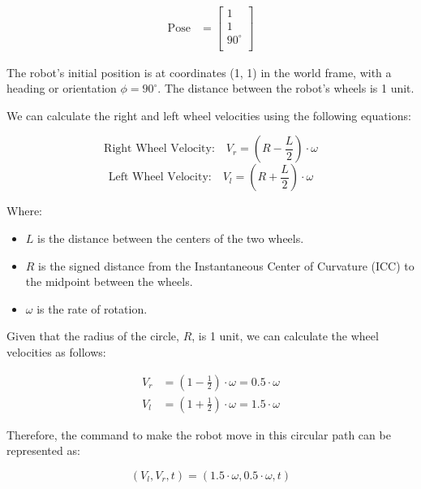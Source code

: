 \documentclass[answers]{exam}
\begin{document}
\begin{questions}
\begin{parts}
\begin{solution}
            \begin{align*}
                \text{Pose} & = \begin{bmatrix}
                                    1        \\
                                    1        \\
                                    90^\circ \\
                                \end{bmatrix}
            \end{align*}

            The robot's initial position is at coordinates (1, 1) in the world frame, with
            a heading or orientation \(\phi = 90^\circ\). The distance between the robot's
            wheels is 1 unit.

            We can calculate the right and left wheel velocities using the following
            equations:

            \[\text{Right Wheel Velocity:} \quad V_r = (R - \frac{L}{2}) \cdot \omega\]
            \[\text{Left Wheel Velocity:} \quad V_l = (R + \frac{L}{2}) \cdot \omega\]

            Where:
            \begin{itemize}
                \item \(L\) is the distance between the centers of the two wheels.
                \item \(R\) is the signed distance from the Instantaneous Center of Curvature (ICC) to the midpoint between the wheels.
                \item \(\omega\) is the rate of rotation.
            \end{itemize}

            Given that the radius of the circle, \(R\), is 1 unit, we can calculate the
            wheel velocities as follows:

            \begin{align*}
                V_r & = (1 - \frac{1}{2}) \cdot \omega = 0.5 \cdot \omega \\
                V_l & = (1 + \frac{1}{2}) \cdot \omega = 1.5 \cdot \omega
            \end{align*}

            Therefore, the command to make the robot move in this circular path can be
            represented as:

            \[(V_l, V_r, t) = (1.5\cdot\omega, 0.5\cdot\omega, t)\]


\end{solution}
\end{parts}
\end{questions}
\end{document}
